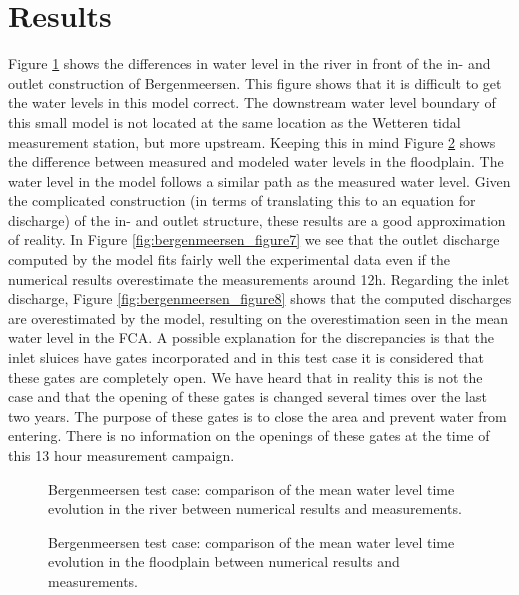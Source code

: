 \section{Results}

Figure \ref{fig:bergenmeersen_figure5} shows the differences in water level in the
river in front of the in- and outlet construction of Bergenmeersen.
This figure shows that it is difficult to get the water levels in this model correct.
The downstream water level boundary of this small model is not located at the same location
as the Wetteren tidal measurement station, but more upstream.
Keeping this in mind Figure \ref{fig:bergenmeersen_figure6} shows the difference between measured
and modeled water levels in the floodplain.
The water level in the model follows a similar path as the measured water level.
Given the complicated construction (in terms of translating this to an equation for discharge)
of the in- and outlet structure, these results are a good approximation of reality.
In Figure \ref{fig:bergenmeersen_figure7} we see that the outlet discharge computed by the model fits
fairly well the experimental data even if the numerical results overestimate the measurements around 12h.
Regarding the inlet discharge, Figure \ref{fig:bergenmeersen_figure8} shows that the computed discharges are
overestimated by the model, resulting on the overestimation seen in the mean water level in the FCA.
A possible explanation for the discrepancies is that the inlet sluices have gates incorporated
and in this test case it is considered that these gates are completely open.
We have heard that in reality this is not the case and that the opening of these gates is
changed several times over the last two years.
The purpose of these gates is to close the area and prevent water from entering.
There is no information on the openings of these gates at the time of this 13 hour measurement campaign.

\begin{figure}[H]
\begin{center}
\end{center}
\caption{Bergenmeersen test case: comparison of the mean water level time evolution in the
river between numerical results and measurements.}
\label{fig:bergenmeersen_figure5}
\end{figure}

\begin{figure}[H]
\begin{center}
\end{center}
\caption{Bergenmeersen test case: comparison of the mean water level time
evolution in the floodplain between numerical results and measurements.}
\label{fig:bergenmeersen_figure6}
\end{figure}

